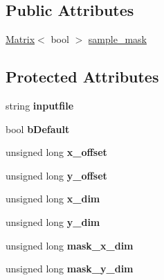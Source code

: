 \subsection*{Public Attributes}
\begin{DoxyCompactItemize}
\item 
\hyperlink{class_matrix}{Matrix}$<$ bool $>$ \hyperlink{class_datamask_ac037e2e0a54970d0ddee0226f695d757}{sample\+\_\+mask}
\end{DoxyCompactItemize}
\subsection*{Protected Attributes}
\begin{DoxyCompactItemize}
\item 
string {\bfseries inputfile}\hypertarget{class_datamask_a4a7fa9c6fbf6b300781202408e6543ef}{}\label{class_datamask_a4a7fa9c6fbf6b300781202408e6543ef}

\item 
bool {\bfseries b\+Default}\hypertarget{class_datamask_af30c08a6917bcd0576c1994a01b4c3ef}{}\label{class_datamask_af30c08a6917bcd0576c1994a01b4c3ef}

\item 
unsigned long {\bfseries x\+\_\+offset}\hypertarget{class_datamask_aa69697b33c10fc1cbf0f4b1882f40b0f}{}\label{class_datamask_aa69697b33c10fc1cbf0f4b1882f40b0f}

\item 
unsigned long {\bfseries y\+\_\+offset}\hypertarget{class_datamask_ad4ad32a90db6f4566507805da5071931}{}\label{class_datamask_ad4ad32a90db6f4566507805da5071931}

\item 
unsigned long {\bfseries x\+\_\+dim}\hypertarget{class_datamask_a364f2256c0b34288f97d89610bd819a2}{}\label{class_datamask_a364f2256c0b34288f97d89610bd819a2}

\item 
unsigned long {\bfseries y\+\_\+dim}\hypertarget{class_datamask_a97b10418a550b9ea215dd194bfcca630}{}\label{class_datamask_a97b10418a550b9ea215dd194bfcca630}

\item 
unsigned long {\bfseries mask\+\_\+x\+\_\+dim}\hypertarget{class_datamask_ace2dcc3b6b6632aa4d506eb7d78aebe6}{}\label{class_datamask_ace2dcc3b6b6632aa4d506eb7d78aebe6}

\item 
unsigned long {\bfseries mask\+\_\+y\+\_\+dim}\hypertarget{class_datamask_a594b8263f9019bced7fa0dd5057759ed}{}\label{class_datamask_a594b8263f9019bced7fa0dd5057759ed}

\end{DoxyCompactItemize}


